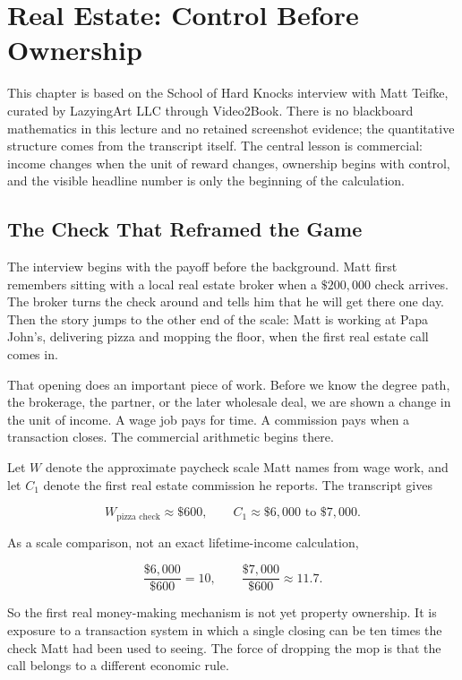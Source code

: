 \chapter{Real Estate: Control Before Ownership}

This chapter is based on the School of Hard Knocks interview with Matt Teifke, curated by LazyingArt LLC through Video2Book. There is no blackboard mathematics in this lecture and no retained screenshot evidence; the quantitative structure comes from the transcript itself. The central lesson is commercial: income changes when the unit of reward changes, ownership begins with control, and the visible headline number is only the beginning of the calculation.

\section{The Check That Reframed the Game}

The interview begins with the payoff before the background. Matt first remembers sitting with a local real estate broker when a \(\$200{,}000\) check arrives. The broker turns the check around and tells him that he will get there one day. Then the story jumps to the other end of the scale: Matt is working at Papa John's, delivering pizza and mopping the floor, when the first real estate call comes in.

That opening does an important piece of work. Before we know the degree path, the brokerage, the partner, or the later wholesale deal, we are shown a change in the unit of income. A wage job pays for time. A commission pays when a transaction closes. The commercial arithmetic begins there.

Let \(W\) denote the approximate paycheck scale Matt names from wage work, and let \(C_1\) denote the first real estate commission he reports. The transcript gives

\begin{equation}
W_{\text{pizza check}} \approx \$600,
\qquad
C_1 \approx \$6{,}000 \text{ to } \$7{,}000 .
\end{equation}

As a scale comparison, not an exact lifetime-income calculation,

\begin{equation}
\frac{\$6{,}000}{\$600}=10,
\qquad
\frac{\$7{,}000}{\$600}\approx 11.7 .
\end{equation}

So the first real money-making mechanism is not yet property ownership. It is exposure to a transaction system in which a single closing can be ten times the check Matt had been used to seeing. The force of dropping the mop is that the call belongs to a different economic rule.


